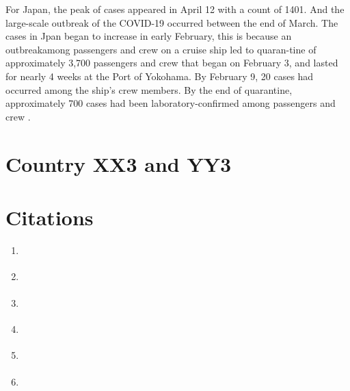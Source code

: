 \documentclass[11pt,a4paper,]{article}
\providecommand{\tightlist}{%
  \setlength{\itemsep}{0pt}\setlength{\parskip}{0pt}}
\begin{document}
For Japan, the peak of cases appeared in April 12 with a count of 1401. And the large-scale outbreak of the COVID-19 occurred between the end of March. The cases in Jpan began to increase in early February, this is because an outbreakamong passengers and crew on a cruise ship led to quaran-tine of approximately 3,700 passengers and crew that began on February 3, and lasted for nearly 4 weeks at the Port of Yokohama. By February 9, 20 cases had occurred among the ship's crew members. By the end of quarantine, approximately 700 cases had been laboratory-confirmed among passengers and crew \textcite{kakimoto2020initial} .

\section*{Country XX3 and YY3}

\clearpage

\hypertarget{citations}{%
\section{Citations}\label{citations}}

\begin{enumerate}
\def\labelenumi{\arabic{enumi}.}
\tightlist
\item
  \textcite{tidyverse}
\item
  \textcite{readr}
\item
  \textcite{KableExtra}
\item
  \textcite{bookdown}
\item
  \textcite{bookdown2}
\item
  \textcite{lubridate}
\end{enumerate}

\clearpage

\printbibliography
\end{document}
